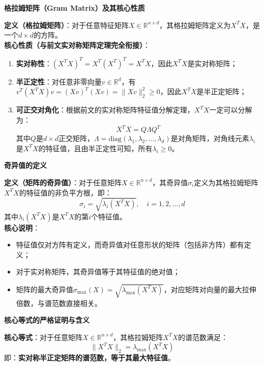 \documentclass[10pt]{article}
\numberwithin{equation}{section}
\theoremstyle{plain}
\theoremstyle{definition}
\theoremstyle{remark}
\begin{document}
{\par\vspace{0.8ex}\noindent\normalsize\bfseries\color{accentD} 格拉姆矩阵（Gram Matrix）及其核心性质\par}
\textbf{定义（格拉姆矩阵）}：对于任意特征矩阵$X \in \mathbb{R}^{n \times d}$，其格拉姆矩阵定义为$X^T X$，是一个$d \times d$的方阵。\\
\textbf{核心性质（与前文实对称矩阵定理完全衔接）}：
\begin{enumerate}[label=\arabic*., leftmargin=*]
    \item \textbf{实对称性}：$(X^T X)^T = X^T (X^T)^T = X^T X$，因此$X^T X$是实对称矩阵；
    \item \textbf{半正定性}：对任意非零向量$v \in \mathbb{R}^d$，有$v^T (X^T X) v = (X v)^T (X v) = \|X v\|_2^2 \ge 0$，因此$X^T X$是半正定矩阵；
    \item \textbf{可正交对角化}：根据前文的实对称矩阵特征值分解定理，$X^T X$一定可以分解为：
    \[ X^T X = Q \Lambda Q^T \]
    其中$Q$是$d \times d$正交矩阵，$\Lambda = \text{diag}(\lambda_1, \lambda_2, \dots, \lambda_d)$是对角矩阵，对角线元素$\lambda_i$是$X^T X$的特征值，且由半正定性可知，所有$\lambda_i \ge 0$。
\end{enumerate}

{\par\vspace{0.8ex}\noindent\normalsize\bfseries\color{accentD} 奇异值的定义\par}
\textbf{定义（矩阵的奇异值）}：对于任意矩阵$X \in \mathbb{R}^{n \times d}$，其奇异值$\sigma_i$定义为其格拉姆矩阵$X^T X$的特征值的非负平方根，即：
\[ \sigma_i = \sqrt{\lambda_i(X^T X)}, \quad i=1,2,\dots,d \]
其中$\lambda_i(X^T X)$是$X^T X$的第$i$个特征值。\\
\textbf{核心说明}：
\begin{itemize}[leftmargin=*,nosep]
    \item 特征值仅对方阵有定义，而奇异值对任意形状的矩阵（包括非方阵）都有定义；
    \item 对于实对称矩阵，其奇异值等于其特征值的绝对值；
    \item 矩阵的最大奇异值$\sigma_{\text{max}}(X) = \sqrt{\lambda_{\text{max}}(X^T X)}$，对应矩阵对向量的最大拉伸倍数，与谱范数直接相关。
\end{itemize}

{\par\vspace{0.8ex}\noindent\normalsize\bfseries\color{accentD} 核心等式的严格证明与含义\par}
\textbf{核心等式}：对于任意矩阵$X \in \mathbb{R}^{n \times d}$，其格拉姆矩阵$X^T X$的谱范数满足：
\[ \|X^T X\|_2 = \lambda_{\text{max}}(X^T X) \]
即：\textbf{实对称半正定矩阵的谱范数，等于其最大特征值}。
\end{document}
